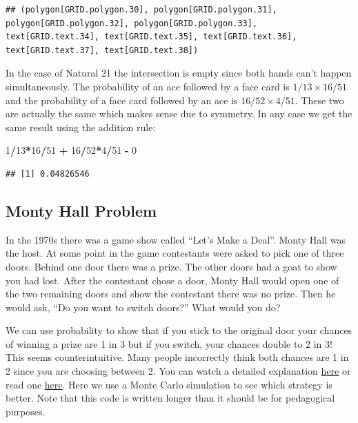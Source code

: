 \documentclass[
  openany]{book}
\newenvironment{Shaded}{\begin{snugshade}}{\end{snugshade}}
\newcommand{\DecValTok}[1]{\textcolor[rgb]{0.00,0.00,0.81}{#1}}
\newcommand{\OperatorTok}[1]{\textcolor[rgb]{0.81,0.36,0.00}{\textbf{#1}}}
\newcommand{\StringTok}[1]{\textcolor[rgb]{0.31,0.60,0.02}{#1}}
\begin{document}
\begin{verbatim}
## (polygon[GRID.polygon.30], polygon[GRID.polygon.31], polygon[GRID.polygon.32], polygon[GRID.polygon.33], text[GRID.text.34], text[GRID.text.35], text[GRID.text.36], text[GRID.text.37], text[GRID.text.38])
\end{verbatim}

In the case of Natural 21 the intersection is empty since both hands can't happen simultaneously. The probability of an ace followed by a face card is \(1/13 \times 16/51\) and the probability of a face card followed by an ace is \(16/52 \times 4/51\). These two are actually the same which makes sense due to symmetry. In any case we get the same result using the addition rule:

\begin{Shaded}
\begin{Highlighting}[]
\DecValTok{1}\OperatorTok{/}\DecValTok{13}\OperatorTok{*}\DecValTok{16}\OperatorTok{/}\DecValTok{51} \OperatorTok{+}\StringTok{ }\DecValTok{16}\OperatorTok{/}\DecValTok{52}\OperatorTok{*}\DecValTok{4}\OperatorTok{/}\DecValTok{51} \OperatorTok{-}\StringTok{ }\DecValTok{0}
\end{Highlighting}
\end{Shaded}

\begin{verbatim}
## [1] 0.04826546
\end{verbatim}

\hypertarget{monty-hall-problem}{%
\subsection{Monty Hall Problem}\label{monty-hall-problem}}

In the 1970s there was a game show called ``Let's Make a Deal''. Monty Hall was the host. At some point in the game contestants were asked to pick one of three doors. Behind one door there was a prize. The other doors had a goat to show you had lost. After the contestant chose a door, Monty Hall would open one of the two remaining doors and show the contestant there was no prize. Then he would ask, ``Do you want to switch doors?'' What would you do?

We can use probability to show that if you stick to the original door your chances of winning a prize are 1 in 3 but if you switch, your chances double to 2 in 3! This seems counterintuitive. Many people incorrectly think both chances are 1 in 2 since you are choosing between 2. You can watch a detailed explanation \href{https://www.khanacademy.org/math/precalculus/prob-comb/dependent-events-precalc/v/monty-hall-problem}{here} or read one \href{https://en.wikipedia.org/wiki/Monty_Hall_problem}{here}. Here we use a Monte Carlo simulation to see which strategy is better. Note that this code is written longer than it should be for pedagogical purposes.
\end{document}
